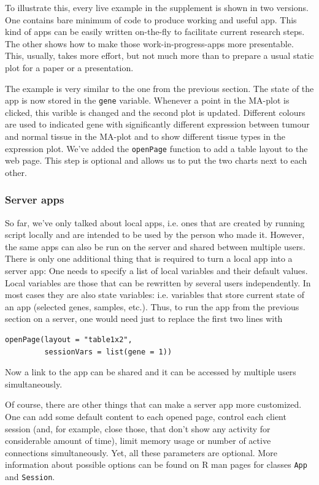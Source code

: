 \documentclass[twocolumn,10pt]{article}
\begin{document}
To illustrate this, every live example in the supplement is shown in two versions. One contains bare minimum of code to produce working and useful app. This kind of apps can be easily written on-the-fly to facilitate current research steps. The other shows how to make those work-in-progress-apps more presentable. This, usually, takes more effort, but not much more than to prepare a usual static plot for a paper or a presentation.


The example is very similar to the one from the previous section. The state of the app is now stored in the \texttt{gene} variable. Whenever a point in the MA-plot is clicked, this varible is changed and the second plot is updated. Different colours are used to indicated gene with significantly different expression between tumour and normal tissue in the MA-plot and to show different tissue types in the expression plot. We've added the \texttt{openPage} function to add a table layout to the web page. This step is optional and allows us to put the two charts next to each other.

\subsubsection{Server apps}

So far, we've only talked about local apps, i.e. ones that are created by running script locally and are intended to be used by the person who made it. However, the same apps can also be run on the server and shared between multiple users. There is only one additional thing that is required to turn a local app into a server app: One needs to specify a list of local variables and their default values. Local variables are those that can be rewritten by several users independently. In most cases they are also state variables: i.e. variables that store current state of an app (selected genes, samples, etc.). Thus, to run the app from the previous section on a server, one would need just to replace the first two lines with

\begin{verbatim}
openPage(layout = "table1x2", 
         sessionVars = list(gene = 1))
\end{verbatim}

Now a link to the app can be shared and it can be accessed by multiple users simultaneously.

Of course, there are other things that can make a server app more customized. One can add some default content to each opened page, control each client session (and, for example, close those, that don't show any activity for considerable amount of time), limit memory usage or number of active connections simultaneously. Yet, all these parameters are optional. More information about possible options can be found on R man pages for classes \texttt{App} and \texttt{Session}.
\end{document}
